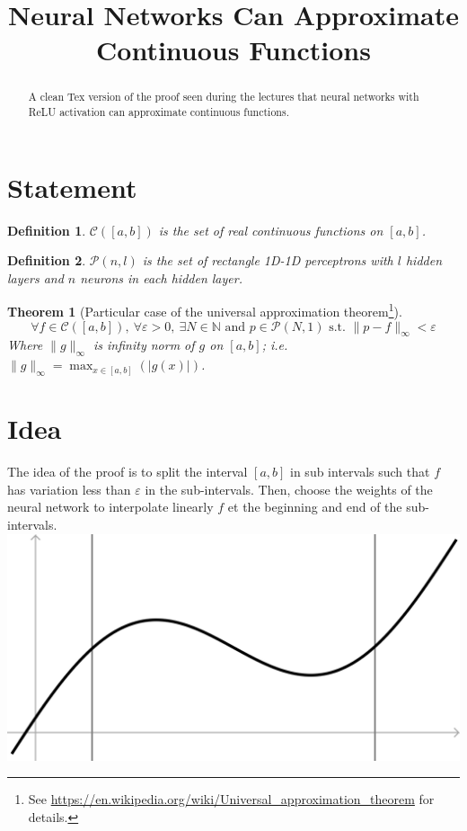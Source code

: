 \documentclass[]{article}
\title{Neural Networks Can Approximate Continuous Functions}
\date{}
\newtheorem*{theorem}{Theorem}
\newtheorem*{definition}{Definition}
\begin{document}
\maketitle

\begin{abstract}
	A clean Tex version of the proof seen during the lectures that neural networks with ReLU activation can approximate continuous functions.
\end{abstract}

\section{Statement}
\begin{definition}
	$\mathcal{C}\left( \left[ a,b \right] \right)$ is the set of real continuous functions on $\left[ a,b \right]$.
\end{definition}
\begin{definition}
	$\mathcal{P}\left( n,l \right)$ is the set of rectangle 1D-1D perceptrons with $l$ hidden layers and $n$ neurons in each hidden layer.
\end{definition}

\begin{theorem}[Particular case of the universal approximation theorem\footnote{See \url{https://en.wikipedia.org/wiki/Universal_approximation_theorem} for details.}]
	$$\forall f \in \mathcal{C}(\left[ a,b \right]), \ \forall \varepsilon > 0, \ \exists N \in \mathbb{N} \text{ and } p \in \mathcal{P}(N,1) \text{ s.t. } \|p-f\|_\infty < \varepsilon$$
	Where $\|g\|_\infty$ is infinity norm of $g$ on $\left[ a,b \right]$; i.e. $\|g\|_\infty = \max_{x \in \left[ a,b \right]}(|g(x)|)$.
\end{theorem}


\section{Idea}
The idea of the proof is to split the interval $\left[ a,b \right]$ in sub intervals such that $f$ has variation less than $\varepsilon$ in the sub-intervals.
Then, choose the weights of the neural network to interpolate linearly $f$ et the beginning and end of the sub-intervals.
\includegraphics[width=\linewidth]{plot}
\end{document}
